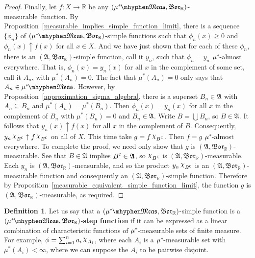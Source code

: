\documentclass[
twoside=true,
paper=letter,
fontsize=9pt,
pagesize=auto,
leqno,
openany,
headsepline,
overfullrule,
]{scrbook}
\theoremstyle{plain}
\theoremstyle{plain}
\theoremstyle{definition}
\newtheorem{defn}[thm]{Definition}
\theoremstyle{bfnoteitalic}
\theoremstyle{bfnoteroman}
\newcommand{\term}[1]{\textbf{#1}\index{#1}}
\newcommand{\sigalg}[1]{\mathfrak{#1}}
\newcommand{\borel}{\mathfrak{Bor}}
\newcommand{\charfunction}[1]{\mathop{{\raisebox{2pt}{$\chi$}}_{#1}}}
\newcommand{\comp}{^{\hbox{\tiny{$\mathsf C$}}}}
\newcommand{\R}{\mathbb{R}}
\newcommand{\sigmaalgebra}{\sigalg{A}}
\newcommand{\measurable}[1]{{#1}\mhyphen\mathfrak{Meas}}
\newcommand{\kernast}{\ast\kern-1pt}
\newcommand{\mbmeasurable}{$(\measurable{\measure^\kernast},\borel_\R)$\hyp{}measurable}
\newcommand{\measurespace}{X}
\newcommand{\mspaceeltii}{y}
\newcommand{\measure}{\mu}
\begin{document}
\begin{proof}
Finally, let $f:\measurespace\to\R$ be any \mbmeasurable\ function.
By Proposition~\ref{measurable_implies_simple_function_limit}, there is a sequence $\{ \phi_n \}$ of $(\measurable{\measure^\kernast},\borel_\R)$-simple functions such that $\phi_n(x)\geq 0$ and $\phi_n(x)\uparrow f(x)$ for all $x\in\measurespace$.
And we have just shown that for each of these $\phi_n$, there is an $(\sigmaalgebra,\borel_\R)$-simple function, call it $\mspaceeltii_n$, such that $\phi_n = \mspaceeltii_n$  $\measure^\kernast$-almost everywhere. That is, $\phi_n(x) = \mspaceeltii_n(x)$ for all $x$ in the complement of some set, call it $A_n$, with $\measure^*(A_n) = 0$. 
The fact that $\measure^*(A_n)=0$ only says that $A_n\in\measurable{\measure^\kernast}$.
However, by Proposition~\ref{approximation_sigma_algebra}, there is a superset $B_n\in \sigmaalgebra$ with $A_n\subseteq B_n$ and $\measure^*(A_n) = \measure^*(B_n)$.
Then $\phi_n(x) = \mspaceeltii_n(x)$ for all $x$ in the complement of $B_n$ with $\measure^*(B_n) = 0$ and $B_n\in\sigmaalgebra$. 
Write $B=\bigcup B_n$, so $B\in\sigmaalgebra$.  
It follows that $\mspaceeltii_n(x) \uparrow f(x)$ for all $x$ in the complement of $B$. Consequently, $\mspaceeltii_n \charfunction{B\comp} \uparrow f \charfunction{B\comp}$ on all of $\measurespace$. This time take $g=f \charfunction{B\comp}$. Then $f = g$ $\measure^\kernast$-almost everywhere. To complete the proof, we need only show that $g$ is $(\sigmaalgebra,\borel_\R)$\hyp{}measurable. See that $B\in\sigmaalgebra$ implies $B\comp\in\sigmaalgebra$, so $\charfunction{B\comp}$ is $(\sigmaalgebra,\borel_\R)$\hyp{}measurable. Each $\mspaceeltii_n$ is $(\sigmaalgebra,\borel_\R)$\hyp{}measurable, and so the product $\mspaceeltii_n \charfunction{B\comp}$ is an $(\sigmaalgebra,\borel_\R)$\hyp{}measurable function and consequently an $(\sigmaalgebra,\borel_\R)$-simple function. Therefore by Proposition~\ref{measurable_equivalent_simple_function_limit}, the function $g$ is $(\sigmaalgebra,\borel_\R)$\hyp{}measurable, as required.
\end{proof}



\begin{defn}\label{step_function}
Let us say that a
$(\measurable{\measure^\kernast}, \borel_\R)$\hyp{}simple function is a
$(\measurable{\measure^\kernast},\borel_\R)$\hyp{}\term{step function} if it can be expressed as a linear combination of characteristic functions of $\measure^\kernast$\hyp{}measurable sets of finite measure.  For example, $\phi=\sum_{i=1}^n a_i\charfunction{A_i}$, where each $A_i$ is a $\measure^\kernast$-measurable set with $\measure^*(A_i) < \infty$, where we can suppose the $A_i$ to be pairwise disjoint.
\end{defn}
\end{document}
